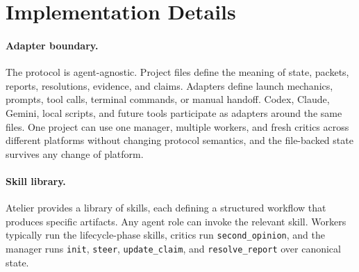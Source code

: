\section{Implementation Details}
\label{app:implementation}

\paragraph{Adapter boundary.}
The protocol is agent-agnostic. Project files define the meaning of state, packets, reports, resolutions, evidence, and claims. Adapters define launch mechanics, prompts, tool calls, terminal commands, or manual handoff. Codex, Claude, Gemini, local scripts, and future tools participate as adapters around the same files. One project can use one manager, multiple workers, and fresh critics across different platforms without changing protocol semantics, and the file-backed state survives any change of platform.

\paragraph{Skill library.}
Atelier provides a library of skills, each defining a structured workflow that produces specific artifacts. Any agent role can invoke the relevant skill. Workers typically run the lifecycle-phase skills, critics run \texttt{second\_opinion}, and the manager runs \texttt{init}, \texttt{steer}, \texttt{update\_claim}, and \texttt{resolve\_report} over canonical state.

